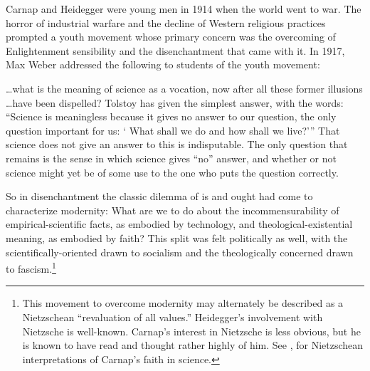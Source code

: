 \documentclass[leqno, 12pt]{turabian-researchpaper}
\begin{document}
	Carnap and Heidegger were young men in 1914 when the world went to war. The
	horror of industrial warfare and the decline of Western religious practices
	prompted a youth movement whose primary concern was the overcoming of
	Enlightenment sensibility and the disenchantment that came with it. In 1917,
	Max Weber addressed the following to students of the youth movement:
	\begin{displayquote}
		 \dots what is the meaning of science as a vocation,
		now after all these former illusions \dots have been dispelled? Tolstoy has given
		the simplest answer, with the words: \enquote{Science is meaningless because it gives %
		no answer to our question, the only question important for us: \enquote{%
		What shall we do and how shall we live?}}
		That science does not give an answer to this is indisputable. The only question
		that remains is the sense in which science gives \enquote{no} answer, and whether
		or not science might yet be of some use to the one who puts the question correctly.
	\end{displayquote}
	So in disenchantment the classic dilemma of is and ought had come to characterize
	modernity: What are we to do about the incommensurability of empirical-scientific
	facts, as embodied by technology, and theological-existential meaning, as embodied
	by faith? This split was felt politically as well, with the scientifically-oriented
	drawn to socialism and the theologically concerned drawn to fascism.\footnote{This
	movement to overcome modernity may alternately be described as a Nietzschean
	\enquote{revaluation of all values.} Heidegger's involvement with Nietzsche is
	well-known. Carnap's interest in Nietzsche is less obvious, but he is known to
	have read and thought rather highly of him. See \autocite{sachs2011},
	\autocite[n22]{stone2017} for Nietzschean interpretations of Carnap's faith in
	science.}
\end{document}
